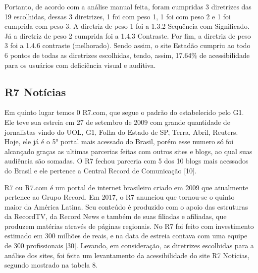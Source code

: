 \documentclass[a4paper]{article}
\begin{document}
\begin{titlepage}
Portanto, de acordo com a análise manual feita, foram cumpridas 3 diretrizes das 19 escolhidas, dessas 3 diretrizes, 1 foi com peso 1, 1 foi com peso 2 e 1 foi cumprida com peso 3. A diretriz de peso 1 foi a 1.3.2 Sequência com Significado. Já a diretriz de peso 2 cumprida foi a 1.4.3 Contraste. Por fim, a diretriz de peso 3 foi a 1.4.6 contraste (melhorado). Sendo assim, o site Estadão cumpriu ao todo 6 pontos de todas as diretrizes escolhidas, tendo, assim, 17.64\% de acessibilidade para os usuários com deficiência visual e auditiva.

\subsection{R7 Notícias}

Em quinto lugar temos 0 R7.com, que segue o padrão do estabelecido pelo G1. Ele teve sua estreia em 27 de setembro de 2009 com grande quantidade de jornalistas vindo do UOL, G1, Folha do Estado de SP, Terra, Abril, Reuters. Hoje, ele já é o 5° portal mais acessado do Brasil, porém esse numero só foi alcançado graças as ultimas parcerias feitas com outros sites e blogs, ao qual suas audiência são somadas. O R7 fechou parceria com 5 dos 10 blogs mais acessados do Brasil e ele pertence a Central Record de Comunicação [10].

R7 ou R7.com é um portal de internet brasileiro criado em 2009 que atualmente pertence ao Grupo Record. Em 2017, o R7 anunciou que tornou-se o quinto maior da América Latina. Seu conteúdo é produzido com o apoio das estruturas da RecordTV, da Record News e também de suas filiadas e afiliadas, que produzem matérias através de páginas regionais. No R7 foi feito com investimento estimado em 300 milhões de reais, e na data de estreia contava com uma equipe de 300 profissionais [30]. Levando, em consideração, as diretrizes escolhidas para a análise dos sites, foi feita um levantamento da acessibilidade do site R7 Notícias, segundo mostrado na tabela 8.\\


\end{titlepage}
\end{document}
